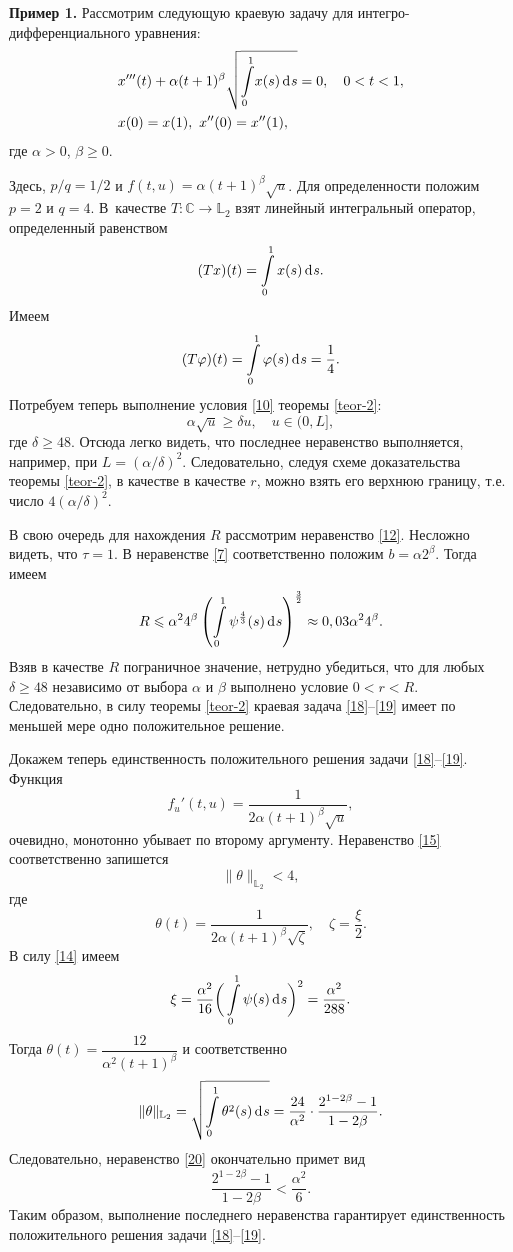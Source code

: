 \documentclass[press]{vestnik}
\begin{document}
{\bf Пример 1.} Рассмотрим следующую краевую задачу для интегро-дифференциального уравнения:
\begin{align}
&x'''(t)+\alpha (t+1)^\beta\sqrt{{\int\limits_{0}^{1}} x(s)\d s} =0,\quad 0<t<1,\label{18}\\
&x(0)=x(1),\    x''(0)=x''(1), \label{19}
\end{align}
где  $\alpha>0$, $\beta\geqslant0$.

Здесь, $p/q=1/2$ и $f(t,u)=\alpha (t+1)^\beta\sqrt{u}$. Для определенности положим $p=2$ и $q=4$. В~качестве $T\colon \mathbb{C} \to \mathbb{L}_2$ взят линейный интегральный оператор, определенный равенством 
\[
(Tx)(t)=\int\limits_{0}^{1}x(s)\d s.
\]
Имеем
\[
(T\varphi)(t)=\int\limits_{0}^{1}\varphi(s)\d s=\frac14.
\]
Потребуем  теперь выполнение условия \eqref{10} теоремы \ref{teor-2}:
\[
\alpha \sqrt{u} \geqslant \delta u, \quad u\in (0,L],
\]
где $\delta \geqslant 48$.
Отсюда легко видеть, что последнее неравенство выполняется, например, при $L=\left({\alpha}/{\delta} \right)^2$. Следовательно, следуя схеме доказательства теоремы \ref{teor-2}, в качестве в качестве $r$, можно взять его верхнюю границу, т.е. число $4\left(\alpha/\delta \right)^2$.

В свою очередь для нахождения $R$ рассмотрим неравенство \eqref{12}. Несложно видеть, что $\tau=1$. В неравенстве \eqref{7} соответственно положим $b=\alpha2^\beta$. Тогда имеем
\[
R\leqslant \alpha^24^\beta\left( \int\limits_{0}^{1}{\psi^\frac43(s)}\d s\right)^\frac32\approx0,03\alpha^24^\beta.
\]
Взяв в качестве $R$ пограничное значение, нетрудно убедиться, что для любых $\delta\geqslant 48$ независимо от выбора $\alpha$ и $\beta$ выполнено условие $0<r<R$. Следовательно, в силу теоремы \ref{teor-2} краевая задача \eqref{18}--\eqref{19} имеет по меньшей мере одно положительное решение.

Докажем теперь единственность положительного решения задачи \eqref{18}--\eqref{19}. Функция 
\[
f_u'(t,u)=\dfrac{1}{2\alpha (t+1)^\beta\sqrt{u}},
\]
очевидно, монотонно убывает по второму аргументу. Неравенство \eqref{15} соответственно запишется 
\begin{equation}
\|\theta\|_{\mathbb{L}_2}<4, \label{20}
\end{equation}
где 
\[
\theta(t)= \frac{1}{2\alpha (t+1)^\beta\sqrt{\zeta}},\quad \zeta=\frac{\xi}{2}.
\]
В силу \eqref{14} имеем
\[
\xi= \dfrac{\alpha^2}{16}\biggl(\,\int\limits_0^1 \psi(s)\d s\biggr)^2=\dfrac{\alpha^2}{288}.
\]
Тогда $\theta(t)= \dfrac{12}{\alpha^2 (t+1)^\beta}$ и соответственно
\[
\|\theta\|_{\mathbb{L}_2}=\sqrt{\int\limits_0^1 \theta^2(s)\d s}=\frac{24}{\alpha^2}\cdot \frac{2^{1-2\beta}-1}{1-2\beta}.
\]
Следовательно, неравенство \eqref{20} окончательно примет вид
\[
\frac{2^{1-2\beta}-1}{1-2\beta}< \frac{\alpha^2}{6}.
\]
Таким образом, выполнение последнего неравенства гарантирует единственность положительного решения задачи \eqref{18}--\eqref{19}.
\end{document}
